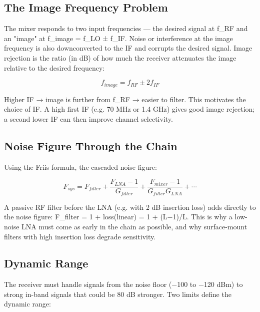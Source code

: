       

\subsection{The Image Frequency Problem}

      

The mixer responds to two input frequencies — the desired signal at f\_RF and an "image" at f\_image = f\_LO ± f\_IF. Noise or interference at the image frequency is also downconverted to the IF and corrupts the desired signal. Image rejection is the ratio (in dB) of how much the receiver attenuates the image relative to the desired frequency:


      
\[f_{image} = f_{RF} \pm 2f_{IF}\]

      

Higher IF → image is further from f\_RF → easier to filter. This motivates the choice of IF. A high first IF (e.g. 70 MHz or 1.4 GHz) gives good image rejection; a second lower IF can then improve channel selectivity.

      

\subsection{Noise Figure Through the Chain}

      

Using the Friis formula, the cascaded noise figure:

      
\[F_{sys} = F_{filter} + \dfrac{F_{LNA}-1}{G_{filter}} + \dfrac{F_{mixer}-1}{G_{filter}G_{LNA}} + \cdots\]

      

A passive RF filter before the LNA (e.g. with 2 dB insertion loss) adds directly to the noise figure: F\_filter = 1 + loss(linear) = 1 + (L−1)/L. This is why a low-noise LNA must come as early in the chain as possible, and why surface-mount filters with high insertion loss degrade sensitivity.

      

\subsection{Dynamic Range}

      

The receiver must handle signals from the noise floor (−100 to −120 dBm) to strong in-band signals that could be 80 dB stronger. Two limits define the dynamic range:

